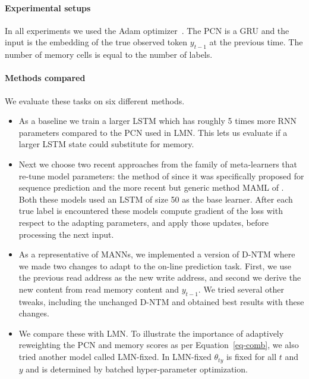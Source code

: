 \documentclass[letterpaper]{article} %
\begin{document}
\paragraph*{Experimental setups}
In all experiments we used the Adam optimizer~\cite{KingmaB14}.  The PCN is a GRU and the input is the embedding of the true observed token $y_{t-1}$ at the previous time.
The number of memory cells is equal to the number of labels.



\paragraph*{Methods compared}

We evaluate these tasks on six different methods.
\begin{itemize}
\item
As a baseline we train a larger LSTM \cite{Hochreiter97lstm} which has roughly 5 times more RNN parameters compared to the PCN used in LMN.  This lets us evaluate if a larger LSTM state could substitute for memory.
\item
Next we choose two recent approaches from the family of meta-learners that re-tune model parameters: the method of \cite{Rei15} since it was specifically proposed for sequence prediction and the more recent but generic method MAML of \cite{Finn2017ModelAgnosticMF}. Both these models used an LSTM of size 50 as the base learner. After each true label is encountered these models compute gradient of the loss with respect to the adapting parameters, and apply those updates, before processing the next input.

\item
As a representative of MANNs, we implemented a version of D-NTM \cite{GulcehreCCB16} where we made two changes to adapt to the on-line prediction task. First, we use the previous read address as the new write address, and second we derive the new content from read memory content and $y_{t-1}$. We tried several other tweaks, including the unchanged D-NTM and obtained best results with these changes.

\item We compare these with LMN. To illustrate the importance of adaptively reweighting the PCN and memory scores as per Equation~\ref{eq-comb}, we also tried another model called LMN-fixed.  In LMN-fixed $\theta_{ty}$ is fixed for all $t$ and $y$ and is determined by batched hyper-parameter optimization.
\end{itemize}
\end{document}
